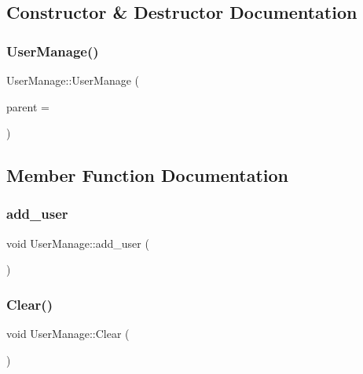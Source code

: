 \subsection{Constructor \& Destructor Documentation}
\mbox{\label{class_user_manage_ae341d2b1a3a87f0603a2788f37517c4a}} 
\subsubsection{\texorpdfstring{UserManage()}{UserManage()}}
{\footnotesize\ttfamily User\+Manage\+::\+User\+Manage (\begin{DoxyParamCaption}\item[{Q\+Widget $\ast$}]{parent = {} }\end{DoxyParamCaption})\hspace{0.3cm}{\ttfamily [explicit]}}



\subsection{Member Function Documentation}
\mbox{\label{class_user_manage_a7058bbb981e4c6b3064c3e5e334ac700}} 
\subsubsection{\texorpdfstring{add\_user}{add\_user}}
{\footnotesize\ttfamily void User\+Manage\+::add\+\_\+user (\begin{DoxyParamCaption}{ }\end{DoxyParamCaption})\hspace{0.3cm}{\ttfamily [slot]}}

\mbox{\label{class_user_manage_af3849a855fdde995372d3162fb358472}} 
\subsubsection{\texorpdfstring{Clear()}{Clear()}}
{\footnotesize\ttfamily void User\+Manage\+::\+Clear (\begin{DoxyParamCaption}{ }\end{DoxyParamCaption})}

